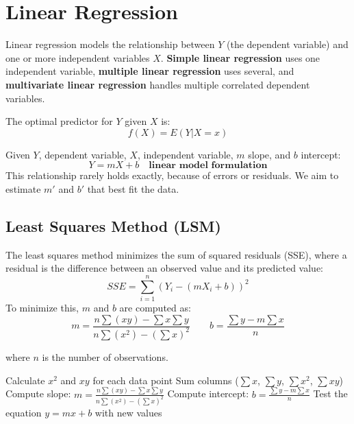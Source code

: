 \section{Linear Regression}
Linear regression models the relationship between \( Y \) (the dependent variable) and one or more independent variables \( X \). \textbf{Simple linear regression} uses one independent variable, \textbf{multiple linear regression} uses several, and \textbf{multivariate linear regression} handles multiple correlated dependent variables.

The optimal predictor for \( Y \) given \( X \) is:
\begin{equation*}
f(X) = E(Y|X=x)
\end{equation*}

\begin{definition}
Given \( Y \), dependent variable, \( X \), independent variable, \( m \) slope, and \( b \) intercept:
\begin{equation}
Y = mX + b \quad \textbf{linear model formulation}
\end{equation}
This relationship rarely holds exactly, because of errors or residuals. We aim to estimate \( m' \) and \( b' \) that best fit the data.
\end{definition}

\subsection{Least Squares Method (LSM)}
The least squares method minimizes the sum of squared residuals (SSE), where a residual is the difference between an observed value and its predicted value:
\begin{equation}
SSE = \sum_{i=1}^{n} (Y_i - (mX_i + b))^2
\end{equation}
To minimize this, \( m \) and \( b \) are computed as:
\begin{equation}
m = \frac{n\sum(xy) - \sum x \sum y}{n\sum(x^2) - (\sum x)^2}
\qquad
b = \frac{\sum y - m \sum x}{n}
\end{equation}

where \( n \) is the number of observations.

\begin{algorithm}
\caption{Least Squares Method Calculation}
\begin{algorithmic}[1]
\State Calculate \(x^2\) and \(xy\) for each data point
\State Sum columns (\(\sum x\), \(\sum y\), \(\sum x^2\), \(\sum xy\))
\State Compute slope: \(m = \frac{n\sum(xy) - \sum x \sum y}{n\sum(x^2) - (\sum x)^2}\)
\State Compute intercept: \(b = \frac{\sum y - m \sum x}{n}\)
\State Test the equation \(y = mx + b\) with new values
\end{algorithmic}
\end{algorithm}

